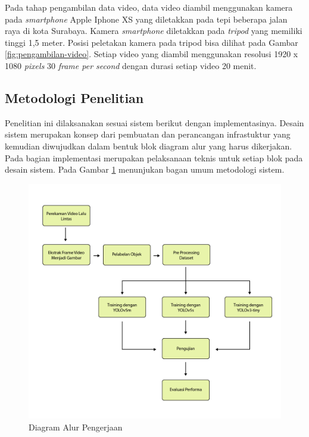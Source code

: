 Pada tahap pengambilan data video, data video diambil menggunakan kamera pada \emph{smartphone} Apple Iphone XS yang diletakkan pada tepi beberapa jalan raya di kota Surabaya. Kamera \emph{smartphone}
diletakkan pada \emph{tripod} yang memiliki tinggi 1,5 meter. Posisi peletakan kamera pada tripod bisa dilihat pada Gambar \ref{fig:pengambilan-video}.
Setiap video yang diambil menggunakan resolusi 1920 x 1080 \emph{pixels} 30 \emph{frame per second} dengan durasi setiap video 20 menit.


\subsection{Metodologi Penelitian}

Penelitian ini dilaksanakan sesuai sistem berikut dengan implementasinya. Desain
sistem merupakan konsep dari pembuatan dan perancangan infrastuktur yang kemudian diwujudkan
dalam bentuk blok diagram alur yang harus dikerjakan. Pada bagian implementasi merupakan
pelaksanaan teknis untuk setiap blok pada desain sistem. Pada Gambar \ref{fig:diagram-alur} menunjukan bagan umum metodologi
sistem.

\begin{figure} [ht] \centering
  \includegraphics[scale=0.25]{gambar/diagram-pengerjaan-2-100.jpg}
  \caption{Diagram Alur Pengerjaan}
  \label{fig:diagram-alur}
\end{figure}

